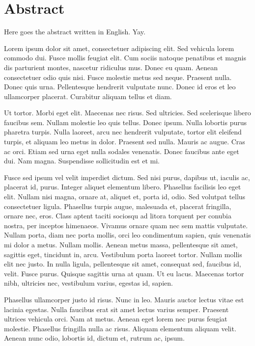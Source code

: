 \chapter*{Abstract}

Here goes the abstract written in English.
Yay.

Lorem ipsum dolor sit amet, consectetuer adipiscing elit. Sed vehicula lorem
commodo dui. Fusce mollis feugiat elit. Cum sociis natoque penatibus et magnis
dis parturient montes, nascetur ridiculus mus. Donec eu quam. Aenean
consectetuer odio quis nisi. Fusce molestie metus sed neque. Praesent nulla.
Donec quis urna. Pellentesque hendrerit vulputate nunc. Donec id eros et leo
ullamcorper placerat. Curabitur aliquam tellus et diam. 

Ut tortor. Morbi eget elit. Maecenas nec risus. Sed ultricies. Sed scelerisque
libero faucibus sem. Nullam molestie leo quis tellus. Donec ipsum. Nulla
lobortis purus pharetra turpis. Nulla laoreet, arcu nec hendrerit vulputate,
tortor elit eleifend turpis, et aliquam leo metus in dolor. Praesent sed nulla.
Mauris ac augue. Cras ac orci. Etiam sed urna eget nulla sodales venenatis.
Donec faucibus ante eget dui. Nam magna. Suspendisse sollicitudin est et mi. 

Fusce sed ipsum vel velit imperdiet dictum. Sed nisi purus, dapibus ut, iaculis
ac, placerat id, purus. Integer aliquet elementum libero. Phasellus facilisis
leo eget elit. Nullam nisi magna, ornare at, aliquet et, porta id, odio. Sed
volutpat tellus consectetuer ligula. Phasellus turpis augue, malesuada et,
placerat fringilla, ornare nec, eros. Class aptent taciti sociosqu ad litora
torquent per conubia nostra, per inceptos himenaeos. Vivamus ornare quam nec
sem mattis vulputate. Nullam porta, diam nec porta mollis, orci leo condimentum
sapien, quis venenatis mi dolor a metus. Nullam mollis. Aenean metus massa,
pellentesque sit amet, sagittis eget, tincidunt in, arcu. Vestibulum porta
laoreet tortor. Nullam mollis elit nec justo. In nulla ligula, pellentesque sit
amet, consequat sed, faucibus id, velit. Fusce purus. Quisque sagittis urna at
quam. Ut eu lacus. Maecenas tortor nibh, ultricies nec, vestibulum varius,
egestas id, sapien. 

Phasellus ullamcorper justo id risus. Nunc in leo. Mauris auctor lectus vitae
est lacinia egestas. Nulla faucibus erat sit amet lectus varius semper.
Praesent ultrices vehicula orci. Nam at metus. Aenean eget lorem nec purus
feugiat molestie. Phasellus fringilla nulla ac risus. Aliquam elementum aliquam
velit. Aenean nunc odio, lobortis id, dictum et, rutrum ac, ipsum. 

